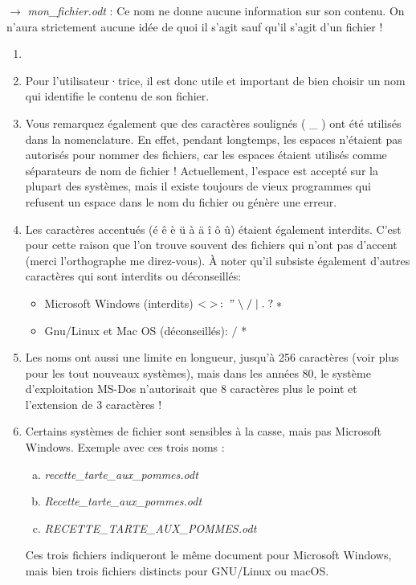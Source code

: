 \documentclass[11pt, a4paper]{book}
\begin{document}
$\rightarrow$ {\it mon\_fichier.odt} : Ce nom ne donne aucune information sur son contenu. On n’aura strictement aucune idée de quoi il s’agit sauf qu’il s’agit d’un fichier !
\begin{remarques}
\begin{enumerate}
\item[]
\item Pour l’utilisateur·trice, il est donc utile et important de bien choisir un nom qui identifie le contenu de son fichier.
\item Vous remarquez également que des caractères soulignés ( \_ ) ont été utilisés dans la nomenclature. En effet, pendant longtemps, les espaces n’étaient pas autorisés pour nommer des fichiers, car les espaces étaient utilisés comme séparateurs de nom de fichier ! Actuellement, l’espace est accepté sur la plupart des systèmes, mais il existe toujours de vieux programmes qui refusent un espace dans le nom du fichier ou génère une erreur.
\item Les caractères accentués (é ê è ü à ä î ô û) étaient également interdits. C’est pour cette raison que l’on trouve souvent des fichiers qui n’ont pas d’accent (merci l’orthographe me direz-vous). À noter qu’il subsiste également d’autres caractères qui sont interdits ou déconseillés:
\begin{itemize}
\item Microsoft Windows (interdits) $< \; >  \,  :  \;   " \;   \backslash \;  / \; \vert \; . \; ? \; *$ 
\item Gnu/Linux et Mac OS (déconseillés): $/$ * 
\end{itemize}
\item Les noms ont aussi une limite en longueur, jusqu’à 256 caractères (voir plus pour les tout nouveaux systèmes), mais dans les années 80, le système d’exploitation MS-Dos n’autorisait que 8 caractères plus le point et l’extension de 3 caractères !
\item Certains systèmes de fichier sont sensibles à la casse, mais pas Microsoft Windows. Exemple avec ces trois noms :
\begin{enumerate}[a)]
\item {\it recette\_tarte\_aux\_pommes.odt}
\item {\it Recette\_tarte\_aux\_pommes.odt}
\item {\it RECETTE\_TARTE\_AUX\_POMMES.odt}
\end{enumerate}
Ces trois fichiers indiqueront le même document pour Microsoft Windows, mais bien trois fichiers distincts pour GNU/Linux ou macOS.
\end{enumerate}
\end{remarques}
\end{document}
